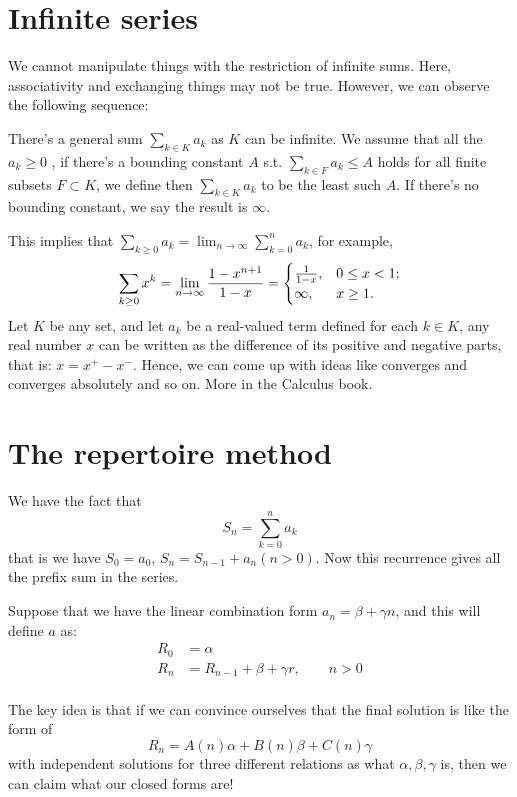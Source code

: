 \section{Infinite series} 

We cannot manipulate things with the restriction of infinite sums. 
Here, associativity and exchanging things may not be true. However, we 
can observe the following sequence: 

There's a general sum $\sum_{k \in K}^{}a_k$ as $K$ can be infinite. 
We assume that all the $a_k\geq 0$
, if there's a bounding constant $A$ s.t. $\sum_{k\in F}a_k\leq A$ holds
for all finite subsets $F \subset K$, we define then $\sum_{k\in K}a_k$
to be the least such $A$. If there's no bounding constant, we say 
the result is $\infty$.

This implies that $\sum_{k\geq 0}a_k=\lim_{n\to \infty} \sum_{k=0}^{n}a_k$,
for example, 
\[
    \sum_{k\geq 0}^{}x^k = \lim_{n \to \infty} {1-x^{n+1}\over 1-x}
    =
    \begin{cases}
        {1\over 1-x}, & 0\leq x< 1;\\
        \infty, &x\geq 1.
    \end{cases}
\]
Let $K$ be any set, and let $a_k$ be a real-valued term defined for each 
$k\in K$, any real number $x$ can be written as the difference of its 
positive and negative parts, that is: $x=x^+-x^-$. Hence, we can come up 
with ideas like converges and converges absolutely and so on. More in the 
Calculus book. 



\section{The repertoire method}

 We have the fact that
\[
    S_n =\sum_{k=0}^{n}a_k
\]
that is we have $S_0 = a_0$, $S_n = S_{n-1}+a_n (n>0)$. 
Now this recurrence gives all the prefix sum in the series. 

Suppose that we have the linear combination form $a_n=\beta + \gamma n$,
and this will define $a$ as: 
\begin{align*}
    R_0 &= \alpha  \\
    R_n &= R_{n-1}+\beta+\gamma r, \qquad n>0 \\
\end{align*}

The key idea is that if we can convince ourselves that the final solution
is like the form of
\[
    R_n = A(n)\alpha+B(n)\beta+C(n)\gamma 
\]
with independent solutions for three different relations as what 
$\alpha,\beta,\gamma$ is, then we can claim what our closed forms 
are! 

